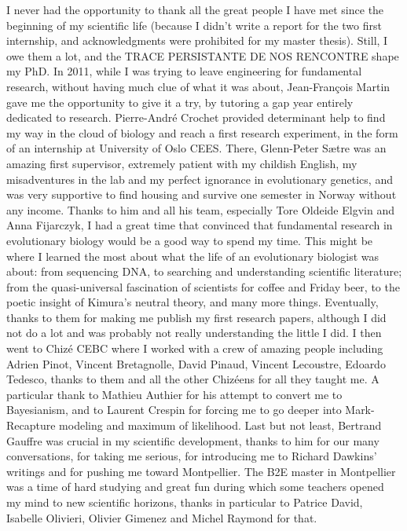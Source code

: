 I never had the opportunity to thank all the great people I have met since the beginning of my scientific life (because I didn't write a report for the two first internship, and acknowledgments were prohibited for my master thesis). Still, I owe them a lot, and the TRACE PERSISTANTE DE NOS RENCONTRE shape my PhD. 
In 2011, while I was trying to leave engineering for fundamental research, without having much clue of what it was about, Jean-Fran\c{c}ois Martin gave me the opportunity to give it a try, by tutoring a gap year entirely dedicated to research. Pierre-Andr\'{e} Crochet provided determinant help to find my way in the cloud of biology and reach a first research experiment, in the form of an internship at University of Oslo CEES. There, Glenn-Peter S{\ae}tre was an amazing first supervisor, extremely patient with my childish English, my misadventures in the lab and my perfect ignorance in evolutionary genetics, and was very supportive to find housing and survive one semester in Norway without any income. Thanks to him and all his team, especially Tore Oldeide Elgvin and Anna Fijarczyk, I had a great time that convinced that fundamental research in evolutionary biology would be a good way to spend my time. This might be where I learned the most about what the life of an evolutionary biologist was about: from sequencing DNA, to searching and understanding scientific literature; from the quasi-universal fascination of scientists for coffee and Friday beer, to the poetic insight of Kimura's neutral theory, and many more things. Eventually, thanks to them for making me publish my first research papers, although I did not do a lot and was probably not really understanding the little I did. 
I then went to Chiz\'{e} CEBC where I worked with a crew of amazing people including Adrien Pinot, Vincent Bretagnolle, David Pinaud, Vincent Lecoustre, Edoardo Tedesco, thanks to them and all the other Chiz\'eens for all they taught me. A particular thank to Mathieu Authier for his attempt to convert me to Bayesianism, and to Laurent Crespin for forcing me to go deeper into Mark-Recapture modeling and maximum of likelihood. Last but not least, Bertrand Gauffre was crucial in my scientific development, thanks to him for our many conversations, for taking me serious, for introducing me to Richard Dawkins' writings and for pushing me toward Montpellier. 
The B2E master in Montpellier was a time of hard studying and great fun during which some teachers opened my mind to new scientific horizons, thanks in particular to Patrice David, Isabelle Olivieri, Olivier Gimenez and Michel Raymond for that.
